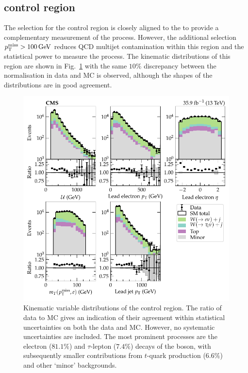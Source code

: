\subsection{\eleplusjets control region}

The selection for the \eleplusjets control region is closely aligned to the \muplusjets to provide a complementary measurement of the \IWlvj process. However, the additional selection ${p_{\text{T}}^{\mathrm{miss}}>\SI{100}{GeV}}$ reduces QCD multijet contamination within this region and the statistical power to measure the \IWlvj process. The kinematic distributions of this region are shown in Fig.~\ref{fig:eleplusjets} with the same $10\%$ discrepancy between the normalisation in data and MC is observed, although the shapes of the distributions are in good agreement.
%
\begin{figure}[htb]
    \centering
    \includegraphics{chapters/042_backgrounds/images/singleele_dists.pdf}
    \caption[Single electron final state kinematics.]{
        Kinematic variable distributions of the \eleplusjets control region. The ratio of data to MC gives an indication of their agreement within statistical uncertainties on both the data and MC. However, no systematic uncertainties are included. The most prominent processes are the electron ($81.1\%$) and $\tau$-lepton ($7.4\%$) decays of the \PW boson, with subsequently smaller contributions from $t$-quark production ($6.6\%$) and other `minor' backgrounds.
    }
    \label{fig:eleplusjets}
\end{figure}
